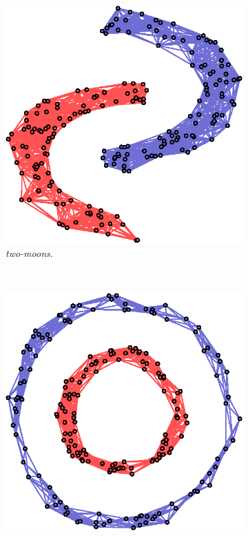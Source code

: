 \begin{figure}[!htb]
    \centering
    \begin{subfigure}[b]{0.23\textwidth}
        \includegraphics[width=\textwidth]{clusters/twomoon.eps}
        \caption{\textit{two-moons}.}
    \end{subfigure}
    ~ %
    \begin{subfigure}[b]{0.23\textwidth}
        \includegraphics[width=\textwidth]{clusters/circles2.eps}

\end{subfigure}
\end{figure}
